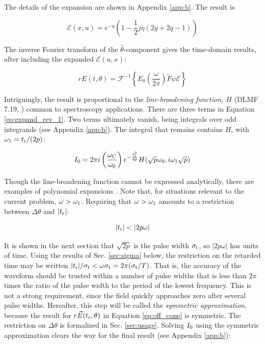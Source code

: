 \documentclass[amsmath,amssymb,aps,prd,10pt,twocolumn]{revtex4}
\begin{document}
The details of the expansion are shown in Appendix \ref{app:b}.  The result is

\begin{equation}
\mathcal{E}(x,u) = e^{-y} \left( 1 - \frac{1}{2} j\eta\left( 2y + 2q - 1 \right) \right) \label{eq:expand_rev_1}
\end{equation}

The inverse Fourier transform of the $\hat{\theta}$-component gives the time-domain results, after including the expanded $\mathcal{E}(u,x)$:

\begin{equation}
r E(t,\theta) = \mathcal{F}^{-1} \left\lbrace E_0 \left(\frac{\omega}{2\pi}\right) \widetilde{F} \psi \mathcal{E} \right\rbrace
\end{equation}

Intriguingly, the result is proportional to the \textit{line-broadening function, $H$} (DLMF 7.19, \cite{NIST:DLMF}) common to spectroscopy applications.  There are three terms in Equation \ref{eq:expand_rev_1}.  Two terms ultimately vanish, being integrals over odd integrands (see Appendix \ref{app:b}).  The integral that remains contains $H$, with $\omega_{\rm 1} = t_{\rm r}/(2p)$:

\begin{equation}
I_{\rm 0} = 2 \pi i \left( \frac{\omega_{\rm C}}{\omega_{\rm 0}} \right) e^{- \frac{t_{\rm r}^2}{4p}} H(\sqrt{p}\omega_0,i\omega_1\sqrt{p})
\end{equation}

Though the line-broadening function cannot be expressed analytically, there are examples of polynomial expansions \cite{10.1111/j.1365-2966.2006.10450.x}.  Note that, for situations relevant to the current problem, $\omega > \omega_{\rm 1}$.  Requiring that $\omega > \omega_{\rm 1}$ amounts to a restriction between $\Delta\theta$ and $|t_{\rm r}|$:

\begin{equation}
|t_{\rm r}| < | 2 p \omega | \label{eq:restrict}
\end{equation}

It is shown in the next section that $\sqrt{2p}$ is the pulse width $\sigma_{\rm t}$, so $| 2 p \omega |$ has units of time.  Using the results of Sec. \ref{sec:sigma} below, the restriction on the retarded time may be written $|t_{\rm r}|/\sigma_{\rm t} < \omega \sigma_{\rm t} = 2\pi (\sigma_{\rm t}/T)$.  That is, the accuracy of the waveform should be trusted within a number of pulse widths that is less than $2\pi$ times the ratio of the pulse width to the period of the lowest frequency.  This is not a strong requirement, since the field quickly approaches zero after several pulse widths.  Hereafter, this step will be called the \textit{symmetric approximation}, because the result for $r \vec{E}(t_{\rm r},\theta)$ in Equation \ref{eq:off_cone} is symmetric.  The restriction on $\Delta\theta$ is formalized in Sec. \ref{sec:usage}.  Solving $I_{\rm 0}$ using the symmetric approximation clears the way for the final result (see Appendix \ref{app:b}):
\end{document}
